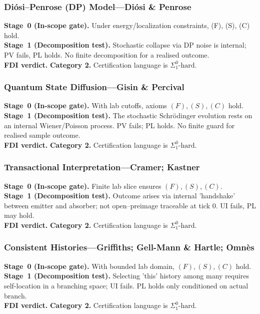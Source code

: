 \documentclass[12pt]{article}
\theoremstyle{definition}
\theoremstyle{plain}
\begin{document}
\subsubsection{Diósi–Penrose (DP) Model––Diósi \& Penrose}
\textbf{Stage~0 (In-scope gate).} Under energy/localization constraints, (F), (S), (C) hold.\\
\textbf{Stage~1 (Decomposition test).} Stochastic collapse via DP noise is internal; PV fails, PL holds. No finite decomposition for a realised outcome.\\
\textbf{FDI verdict.} \textbf{Category 2.} Certification language is \(\Sigma^0_1\text{-hard}\).  
\subsubsection{Quantum State Diffusion––Gisin \& Percival}
\textbf{Stage~0 (In-scope gate).} With lab cutoffs, axioms \((F),(S),(C)\) hold.\\
\textbf{Stage~1 (Decomposition test).} The stochastic Schrödinger evolution rests on an internal Wiener/Poisson process. PV fails; PL holds. No finite guard for realised sample outcome.\\
\textbf{FDI verdict.} \textbf{Category 2.} Certification language is \(\Sigma^0_1\text{-hard}\).  
\subsubsection{Transactional Interpretation––Cramer; Kastner}
\textbf{Stage~0 (In-scope gate).} Finite lab slice ensures \((F),(S),(C)\).\\
\textbf{Stage~1 (Decomposition test).} Outcome arises via internal 'handshake' between emitter and absorber; not open–preimage traceable at tick 0. UI fails, PL may hold.\\
\textbf{FDI verdict.} \textbf{Category 2.} Certification language is \(\Sigma^0_1\text{-hard}\).  
\subsubsection{Consistent Histories––Griffiths; Gell-Mann \& Hartle; Omnès}
\textbf{Stage~0 (In-scope gate).} With bounded lab domain, \((F),(S),(C)\) hold.\\
\textbf{Stage~1 (Decomposition test).} Selecting 'this' history among many requires self-location in a branching space; UI fails. PL holds only conditioned on actual branch.\\
\textbf{FDI verdict.} \textbf{Category 2.} Certification language is \(\Sigma^0_1\text{-hard}\).  
\end{document}
